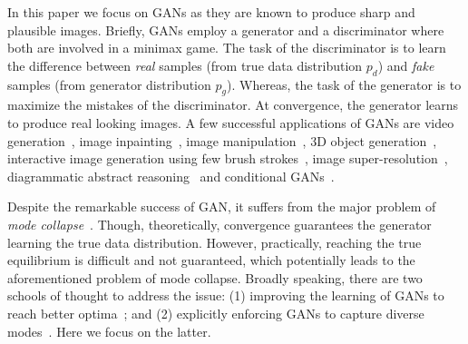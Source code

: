 In this paper we focus on GANs as they are known to produce sharp and plausible images. Briefly, GANs employ a generator and a discriminator where both are involved in a minimax game. The task of the discriminator is to learn the difference between {\em real} samples (from true data distribution $p_d$) and {\em fake} samples (from generator distribution $p_g$). Whereas, the task of the generator is to maximize the mistakes of the discriminator. At convergence, the generator learns to produce real looking images. A few successful applications of GANs are video generation~\cite{vondrick2016generating}, image inpainting~\cite{pathak2016context}, image manipulation~\cite{zhu2016generative}, 3D object generation~\cite{wu2016learning}, interactive image generation using few brush strokes~\cite{zhu2016generative}, image super-resolution~\cite{ledig2016photo}, diagrammatic abstract reasoning~\cite{ghosh2017contextual} and conditional GANs~\cite{mirza2014conditional,reed2016generative}.

Despite the remarkable success of GAN, it suffers from the major problem of {\em mode collapse}~\cite{arjovsky2016towards,che2016mode,chen2016infogan,metz2017unrolledGAN,salimans2016improved}. Though, theoretically, convergence guarantees the generator learning the true data distribution. However, practically, reaching the true equilibrium is difficult and not guaranteed, which potentially leads to the aforementioned problem of mode collapse. Broadly speaking, there are two schools of thought to address the issue: (1) improving the learning of GANs to reach better optima~\cite{arjovsky2016towards,metz2017unrolledGAN,salimans2016improved}; and (2) explicitly enforcing GANs to capture diverse modes~\cite{che2016mode,chen2016infogan,liu2016coupled}. Here we focus on the latter.


